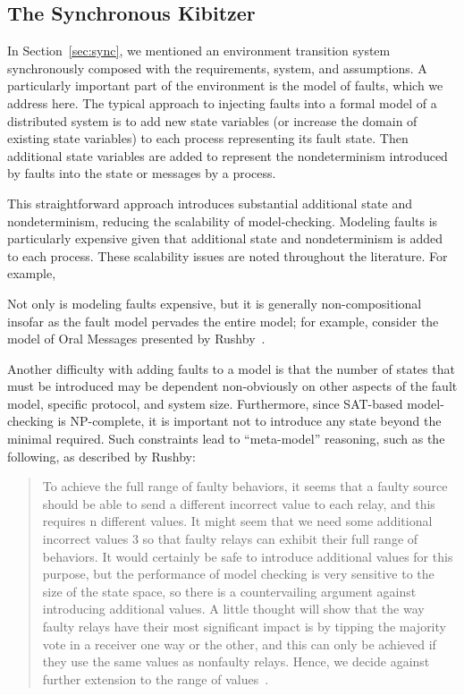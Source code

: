 \documentclass{llncs/llncs}
\newcommand{\lee}[1]{ } %
\newcommand{\lee}[1]{ {\color{blue}$<$lee: #1$>$} } %
\begin{document}
\subsection{The Synchronous Kibitzer}\label{sec:kibitzer}
\lee{We use synchronous composition to implement fault injection. Mention in the intro. This is fundamental to the model, so we have section devoted to it.}
In Section~\ref{sec:sync}, we mentioned an environment transition system synchronously composed with the requirements, system, and assumptions. A particularly important part of the environment is the model of faults, which we address here. The typical approach to injecting faults into a formal model of a distributed system is to add new state variables (or increase the domain of existing state variables) to each process representing its fault state. Then additional state variables are added to represent the nondeterminism introduced by faults into the state or messages by a process.

This straightforward approach introduces substantial additional state and nondeterminism, reducing the scalability of model-checking. Modeling faults is particularly expensive given that additional state and nondeterminism is added to each process. These scalability issues are noted throughout the literature. For example, \lee{TTA startup paper, helmut's paper, etc.}

Not only is modeling faults expensive, but it is generally non-compositional insofar as the fault model pervades the entire model; for example, consider the model of Oral Messages presented by Rushby~\cite{}.

Another difficulty with adding faults to a model is that the number of states that must be introduced may be dependent non-obviously on other aspects of the fault model, specific protocol, and system size. Furthermore, since SAT-based model-checking is NP-complete, it is important not to introduce any state beyond the minimal required. Such constraints lead to ``meta-model'' reasoning, such as the following, as described by Rushby:

\begin{quote}
To achieve the full range of faulty behaviors, it seems that a faulty source should be able to send a different incorrect value to each relay, and this requires n different values. It might seem that we need some additional incorrect values 3 so that faulty relays can exhibit their full range of behaviors. It would certainly be safe to introduce additional values for this purpose, but the performance of model checking is very sensitive to the size of the state space, so there is a countervailing argument against introducing additional values. A little thought will show that the way faulty relays have their most significant impact is by tipping the majority vote in a receiver one way or the other, and this can only be achieved if they use the same values as nonfaulty relays. Hence, we decide against further extension to the range of values~\cite{}.
\end{quote}
\end{document}
